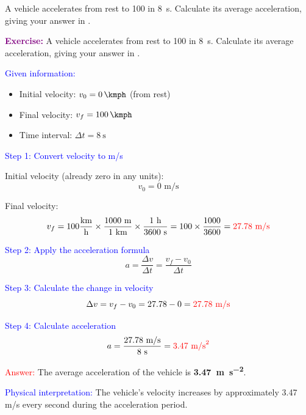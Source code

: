 \begin{exercise}
    A vehicle accelerates from rest to \qty{100}{\kmph} in \qty{8}{\s}. Calculate its average acceleration, giving your answer in \unit{\mpss}.
    \begin{solu}
        \textbf{\textcolor{purple}{Exercise:}} A vehicle accelerates from rest to \qty{100}{\kmph} in \qty{8}{\s}. Calculate its average acceleration, giving your answer in \unit{\mpss}.

        \vspace{0.3cm}

        \textcolor{blue}{Given information:}
        \begin{itemize}
            \item Initial velocity: $v_0 = \qty{0}{\kmph}$ (from rest)
            \item Final velocity: $v_f = \qty{100}{\kmph}$
            \item Time interval: $\Delta t = \qty{8}{\s}$
        \end{itemize}

        \textcolor{blue}{Step 1: Convert velocity to m/s}

        Initial velocity (already zero in any units):
        \[
            v_0 = 0 \text{ m/s}
        \]

        Final velocity:
        \[
            v_f = 100 \frac{\text{km}}{\text{h}} \times \frac{1000 \text{ m}}{1 \text{ km}} \times \frac{1 \text{ h}}{3600 \text{ s}} = 100 \times \frac{1000}{3600} = \textcolor{red}{27.78 \text{ m/s}}
        \]

        \textcolor{blue}{Step 2: Apply the acceleration formula}
        \[
            \boxed{a = \frac{\Delta v}{\Delta t} = \frac{v_f - v_0}{\Delta t}}
        \]

        \textcolor{blue}{Step 3: Calculate the change in velocity}
        \[
            \Delta v = v_f - v_0 = 27.78 - 0 = \textcolor{red}{27.78 \text{ m/s}}
        \]

        \textcolor{blue}{Step 4: Calculate acceleration}
        \[
            a = \frac{27.78 \text{ m/s}}{8 \text{ s}} = \textcolor{red}{3.47 \text{ m/s}^2}
        \]

        \textcolor{red}{Answer:} The average acceleration of the vehicle is \textbf{\qty{3.47}{\metre\per\second\squared}}.

        \textcolor{blue}{Physical interpretation:} The vehicle's velocity increases by approximately 3.47 m/s every second during the acceleration period.
    \end{solu}
\end{exercise}


